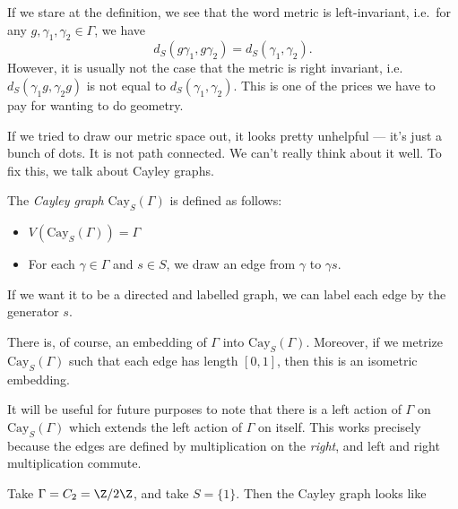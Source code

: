 \documentclass[a4paper]{article}
\newcommand\Cay{\mathrm{Cay}}
\begin{document}
If we stare at the definition, we see that the word metric is left-invariant, i.e.\ for any $g, \gamma_1, \gamma_2 \in \Gamma$, we have
\[
  d_S(g \gamma_1, g \gamma_2) = d_S(\gamma_1, \gamma_2).
  \]
However, it is usually not the case that the metric is right invariant, i.e.\ $d_S(\gamma_1 g, \gamma_2 g)$ is not equal to $d_S(\gamma_1, \gamma_2)$. This is one of the prices we have to pay for wanting to do geometry.

If we tried to draw our metric space out, it looks pretty unhelpful --- it's just a bunch of dots. It is not path connected. We can't really think about it well. To fix this, we talk about Cayley graphs.

\begin{defi}
  The \emph{Cayley graph} $\Cay_S(\Gamma)$ is defined as follows:
  \begin{itemize}
    \item $V(\Cay_S(\Gamma)) = \Gamma$
    \item For each $\gamma \in \Gamma$ and $s \in S$, we draw an edge from $\gamma$ to $\gamma s$.
  \end{itemize}
  If we want it to be a directed and labelled graph, we can label each edge by the generator $s$.
\end{defi}

There is, of course, an embedding of $\Gamma$ into $\Cay_S(\Gamma)$. Moreover, if we metrize $\Cay_S(\Gamma)$ such that each edge has length $[0, 1]$, then this is an isometric embedding.

It will be useful for future purposes to note that there is a left action of $\Gamma$ on $\Cay_S(\Gamma)$ which extends the left action of $\Gamma$ on itself. This works precisely because the edges are defined by multiplication on the \emph{right}, and left and right multiplication commute.

\begin{eg}
  Take $\Gamma = C_2 = \Z/2\Z$, and take $S = \{1\}$. Then the Cayley graph looks like
  \begin{center}
  \end{center}
\end{eg}
\end{document}

